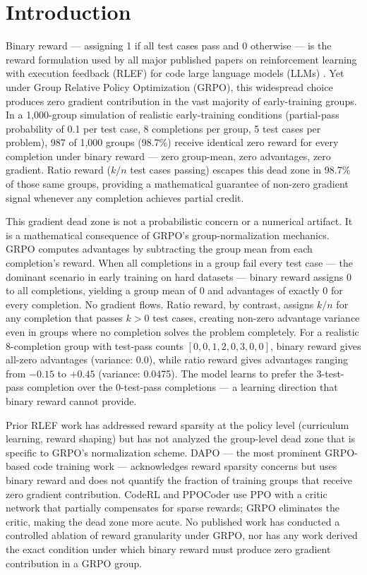 \section{Introduction}

Binary reward --- assigning 1 if all test cases pass and 0 otherwise --- is the reward formulation used by all major published papers on reinforcement learning with execution feedback (RLEF) for code large language models (LLMs) \citep{le2022coderl,shojaee2023ppocoder,gehring2024rlef,yu2025dapo}. Yet under Group Relative Policy Optimization (GRPO), this widespread choice produces zero gradient contribution in the vast majority of early-training groups. In a 1,000-group simulation of realistic early-training conditions (partial-pass probability of 0.1 per test case, 8 completions per group, 5 test cases per problem), 987 of 1,000 groups (98.7\%) receive identical zero reward for every completion under binary reward --- zero group-mean, zero advantages, zero gradient. Ratio reward ($k/n$ test cases passing) escapes this dead zone in 98.7\% of those same groups, providing a mathematical guarantee of non-zero gradient signal whenever any completion achieves partial credit.

This gradient dead zone is not a probabilistic concern or a numerical artifact. It is a mathematical consequence of GRPO's group-normalization mechanics. GRPO computes advantages by subtracting the group mean from each completion's reward. When all completions in a group fail every test case --- the dominant scenario in early training on hard datasets --- binary reward assigns 0 to all completions, yielding a group mean of 0 and advantages of exactly 0 for every completion. No gradient flows. Ratio reward, by contrast, assigns $k/n$ for any completion that passes $k > 0$ test cases, creating non-zero advantage variance even in groups where no completion solves the problem completely. For a realistic 8-completion group with test-pass counts $[0, 0, 1, 2, 0, 3, 0, 0]$, binary reward gives all-zero advantages (variance: 0.0), while ratio reward gives advantages ranging from $-0.15$ to $+0.45$ (variance: 0.0475). The model learns to prefer the 3-test-pass completion over the 0-test-pass completions --- a learning direction that binary reward cannot provide.

Prior RLEF work has addressed reward sparsity at the policy level (curriculum learning, reward shaping) but has not analyzed the group-level dead zone that is specific to GRPO's normalization scheme. DAPO \citep{yu2025dapo} --- the most prominent GRPO-based code training work --- acknowledges reward sparsity concerns but uses binary reward and does not quantify the fraction of training groups that receive zero gradient contribution. CodeRL \citep{le2022coderl} and PPOCoder \citep{shojaee2023ppocoder} use PPO with a critic network that partially compensates for sparse rewards; GRPO eliminates the critic, making the dead zone more acute. No published work has conducted a controlled ablation of reward granularity under GRPO, nor has any work derived the exact condition under which binary reward must produce zero gradient contribution in a GRPO group.

